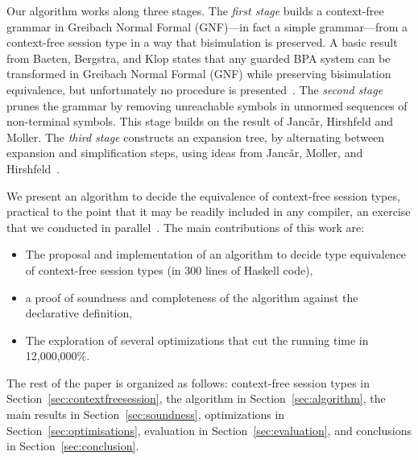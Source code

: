 Our algorithm works along three stages.
%
The \emph{first stage} builds a context-free grammar in Greibach
Normal Formal (GNF)---in fact a simple grammar---from a context-free
session type in a way that bisimulation is preserved.  A basic result
from Baeten, Bergstra, and Klop states that any guarded BPA system can
be transformed in Greibach Normal Formal (GNF) while preserving
bisimulation equivalence, but unfortunately no procedure is
presented~\cite{baeten1993decidability}.
%
The \emph{second stage} prunes the grammar by removing unreachable
symbols in unnormed sequences of non-terminal symbols. This stage
builds on the result of Janc\v ar, Hirshfeld and Moller.
%
The \emph{third stage} constructs an expansion tree, by alternating
between expansion and simplification steps, using ideas from Janc\v
ar, Moller, and
Hirshfeld~\cite{hirshfeld1996bisimulation,janvcar1999techniques}.
%

We present an algorithm to decide the equivalence of context-free
session types, practical to the point that it may be readily included
in any compiler, an exercise that we conducted in
parallel~\cite{freeST}.
%
The main contributions of this work are:
%
\begin{itemize}
\item The proposal and implementation of an algorithm to decide type
  equivalence of context-free session types (in 300 lines of Haskell
  code),
\item a proof of soundness and completeness of the algorithm against
  the declarative definition,
\item The exploration of several optimizations that cut the running
  time in 12,000,000\%.
\end{itemize}


The rest of the paper is organized as follows: context-free session
types in Section~\ref{sec:contextfreesession}, the algorithm in
Section~\ref{sec:algorithm}, the main results in
Section~\ref{sec:soundness}, optimizations in
Section~\ref{sec:optimisations}, evaluation in
Section~\ref{sec:evaluation}, and conclusions in
Section~\ref{sec:conclusion}.


